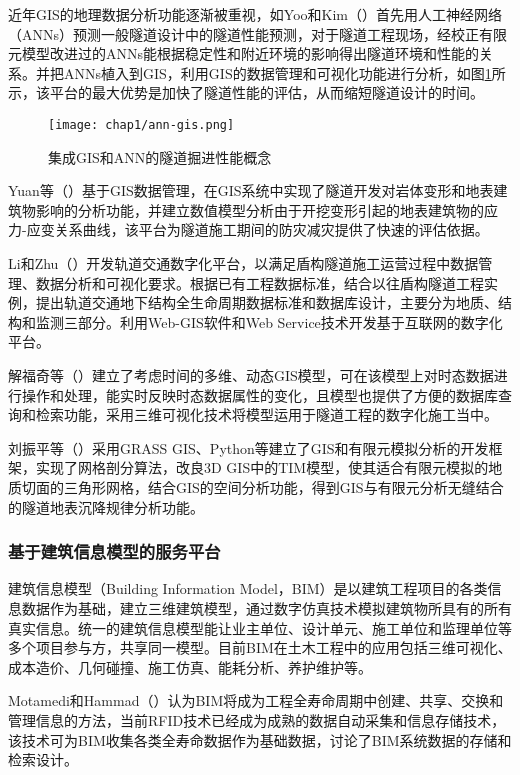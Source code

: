 近年GIS的地理数据分析功能逐渐被重视，如Yoo和Kim（\citeyear{yoo2007tunneling}）首先用人工神经网络（ANNs）预测一般隧道设计中的隧道性能预测，对于隧道工程现场，经校正有限元模型改进过的ANNs能根据稳定性和附近环境的影响得出隧道环境和性能的关系。并把ANNs植入到GIS，利用GIS的数据管理和可视化功能进行分析，如图\ref{fig:集成GIS和ANN的隧道掘进性能概念}所示，该平台的最大优势是加快了隧道性能的评估，从而缩短隧道设计的时间。

\begin{figure}[!h]
	\centering
	\texttt{[image: chap1/ann-gis.png]}
	\caption{集成GIS和ANN的隧道掘进性能概念}
	\label{fig:集成GIS和ANN的隧道掘进性能概念}
\end{figure}

Yuan等（\citeyear{yuan2012study}）基于GIS数据管理，在GIS系统中实现了隧道开发对岩体变形和地表建筑物影响的分析功能，并建立数值模型分析由于开挖变形引起的地表建筑物的应力-应变关系曲线，该平台为隧道施工期间的防灾减灾提供了快速的评估依据。

Li和Zhu（\citeyear{li2013development}）开发轨道交通数字化平台，以满足盾构隧道施工运营过程中数据管理、数据分析和可视化要求。根据已有工程数据标准，结合以往盾构隧道工程实例，提出轨道交通地下结构全生命周期数据标准和数据库设计，主要分为地质、结构和监测三部分。利用Web-GIS软件和Web Service技术开发基于互联网的数字化平台。

解福奇等（\citeyear{解福奇2009时态}）建立了考虑时间的多维、动态GIS模型，可在该模型上对时态数据进行操作和处理，能实时反映时态数据属性的变化，且模型也提供了方便的数据库查询和检索功能，采用三维可视化技术将模型运用于隧道工程的数字化施工当中。

刘振平等（\citeyear{刘振平20173d}）采用GRASS GIS、Python等建立了GIS和有限元模拟分析的开发框架，实现了网格剖分算法，改良3D GIS中的TIM模型，使其适合有限元模拟的地质切面的三角形网格，结合GIS的空间分析功能，得到GIS与有限元分析无缝结合的隧道地表沉降规律分析功能。

\subsubsection{基于建筑信息模型的服务平台}

建筑信息模型（Building Information Model，BIM）是以建筑工程项目的各类信息数据作为基础，建立三维建筑模型，通过数字仿真技术模拟建筑物所具有的所有真实信息。统一的建筑信息模型能让业主单位、设计单元、施工单位和监理单位等多个项目参与方，共享同一模型。目前BIM在土木工程中的应用包括三维可视化、成本造价、几何碰撞、施工仿真、能耗分析、养护维护等。

Motamedi和Hammad（\citeyear{motamedi2009lifecycle}）认为BIM将成为工程全寿命周期中创建、共享、交换和管理信息的方法，当前RFID技术已经成为成熟的数据自动采集和信息存储技术，该技术可为BIM收集各类全寿命数据作为基础数据，讨论了BIM系统数据的存储和检索设计。

